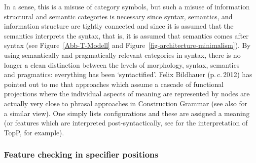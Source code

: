 %
In a sense, this is a misuse of category symbols, but such a misuse of information structural and semantic
categories is necessary since syntax, semantics, and information structure are tightly connected
and since it is assumed that the semantics interprets the syntax, that is, it is assumed that semantics comes
after syntax (see Figure~\ref{Abb-T-Modell} and Figure~\ref{fig-architecture-minimalism}). By using
semantically and pragmatically relevant categories in syntax, there is no longer a clean distinction between
the levels of morphology, syntax, semantics and pragmatics: everything has been `syntactified'.
Felix Bildhauer (p.\,c.\,2012) has pointed out to me that
approaches which assume a cascade of functional projections where the individual aspects of meaning are represented by nodes are actually very
close to phrasal approaches in Construction Grammar (see \citealp[]{Adger2013a} also for a
similar view). One simply lists configurations and these are assigned a meaning (or features which are 
interpreted post-syntactically, see  for the interpretation of TopP, for
example). 

\subsubsection{Feature checking in specifier positions}

